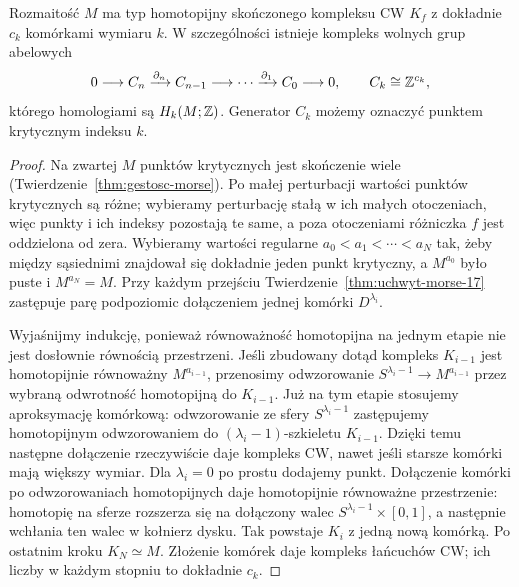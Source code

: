\begin{twierdzenie}
\label{thm:cw-morse-17}
Rozmaitość $M$ ma typ homotopijny
skończonego kompleksu CW $K_f$
z dokładnie $c_k$ komórkami
wymiaru $k$. W szczególności
istnieje kompleks wolnych grup
abelowych
\[
 0\longrightarrow C_n
 \xrightarrow{\partial_n}C_{n-1}
 \longrightarrow\cdots
 \xrightarrow{\partial_1}C_0
 \longrightarrow0,\qquad
 C_k\cong\mathbb{Z}^{c_k},
\]
którego homologiami są $H_k(M;\mathbb{Z})$.
Generator $C_k$ możemy oznaczyć
punktem krytycznym indeksu $k$.
\end{twierdzenie}
\begin{proof}
Na zwartej $M$ punktów krytycznych
jest skończenie wiele
(Twierdzenie~\ref{thm:gestosc-morse}).
Po małej perturbacji wartości
punktów krytycznych są różne;
wybieramy perturbację stałą
w ich małych otoczeniach,
więc punkty i ich indeksy
pozostają te same, a poza
otoczeniami różniczka $f$
jest oddzielona od zera.
Wybieramy wartości
regularne
$a_0<a_1<\cdots<a_N$
tak, żeby między sąsiednimi
znajdował się dokładnie jeden
punkt krytyczny, a $M^{a_0}$
było puste i $M^{a_N}=M$.
Przy każdym przejściu
Twierdzenie~\ref{thm:uchwyt-morse-17}
zastępuje parę podpoziomic
dołączeniem jednej komórki
$D^{\lambda_i}$.

Wyjaśnijmy indukcję, ponieważ
równoważność homotopijna na
jednym etapie nie jest dosłownie
równością przestrzeni.
Jeśli zbudowany dotąd kompleks
$K_{i-1}$ jest homotopijnie
równoważny $M^{a_{i-1}}$,
przenosimy odwzorowanie
$S^{\lambda_i-1}\to M^{a_{i-1}}$
przez wybraną odwrotność
homotopijną do $K_{i-1}$.
Już na tym etapie stosujemy aproksymację komórkową:
odwzorowanie ze sfery $S^{\lambda_i-1}$ zastępujemy homotopijnym
odwzorowaniem do $(\lambda_i-1)$-szkieletu $K_{i-1}$.
Dzięki temu następne dołączenie rzeczywiście daje
kompleks CW, nawet jeśli starsze komórki mają większy wymiar.
Dla $\lambda_i=0$ po prostu dodajemy punkt.
Dołączenie komórki po odwzorowaniach
homotopijnych daje
homotopijnie równoważne
przestrzenie: homotopię
na sferze rozszerza się
na dołączony walec
$S^{\lambda_i-1}\times[0,1]$,
a następnie wchłania ten
walec w kołnierz dysku.
Tak powstaje $K_i$ z jedną
nową komórką.
Po ostatnim kroku
$K_N\simeq M$.
Złożenie komórek daje
kompleks łańcuchów CW;
ich liczby w każdym stopniu
to dokładnie $c_k$.
\end{proof}

